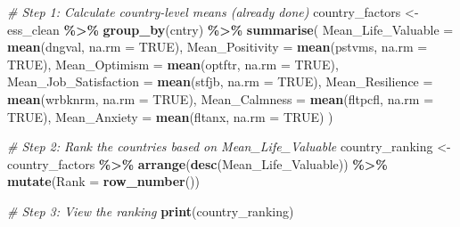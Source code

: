 \documentclass[
]{article}
\newenvironment{Shaded}{\begin{snugshade}}{\end{snugshade}}
\newcommand{\AttributeTok}[1]{\textcolor[rgb]{0.13,0.29,0.53}{#1}}
\newcommand{\CommentTok}[1]{\textcolor[rgb]{0.56,0.35,0.01}{\textit{#1}}}
\newcommand{\ConstantTok}[1]{\textcolor[rgb]{0.56,0.35,0.01}{#1}}
\newcommand{\FunctionTok}[1]{\textcolor[rgb]{0.13,0.29,0.53}{\textbf{#1}}}
\newcommand{\NormalTok}[1]{#1}
\newcommand{\OtherTok}[1]{\textcolor[rgb]{0.56,0.35,0.01}{#1}}
\newcommand{\SpecialCharTok}[1]{\textcolor[rgb]{0.81,0.36,0.00}{\textbf{#1}}}
\begin{document}
\begin{Shaded}
\begin{Highlighting}[]
\CommentTok{\# Step 1: Calculate country{-}level means (already done)}
\NormalTok{country\_factors }\OtherTok{\textless{}{-}}\NormalTok{ ess\_clean }\SpecialCharTok{\%\textgreater{}\%}
  \FunctionTok{group\_by}\NormalTok{(cntry) }\SpecialCharTok{\%\textgreater{}\%}
  \FunctionTok{summarise}\NormalTok{(}
    \AttributeTok{Mean\_Life\_Valuable =} \FunctionTok{mean}\NormalTok{(dngval, }\AttributeTok{na.rm =} \ConstantTok{TRUE}\NormalTok{),}
    \AttributeTok{Mean\_Positivity =} \FunctionTok{mean}\NormalTok{(pstvms, }\AttributeTok{na.rm =} \ConstantTok{TRUE}\NormalTok{),}
    \AttributeTok{Mean\_Optimism =} \FunctionTok{mean}\NormalTok{(optftr, }\AttributeTok{na.rm =} \ConstantTok{TRUE}\NormalTok{),}
    \AttributeTok{Mean\_Job\_Satisfaction =} \FunctionTok{mean}\NormalTok{(stfjb, }\AttributeTok{na.rm =} \ConstantTok{TRUE}\NormalTok{),}
    \AttributeTok{Mean\_Resilience =} \FunctionTok{mean}\NormalTok{(wrbknrm, }\AttributeTok{na.rm =} \ConstantTok{TRUE}\NormalTok{),}
    \AttributeTok{Mean\_Calmness =} \FunctionTok{mean}\NormalTok{(fltpcfl, }\AttributeTok{na.rm =} \ConstantTok{TRUE}\NormalTok{),}
    \AttributeTok{Mean\_Anxiety =} \FunctionTok{mean}\NormalTok{(fltanx, }\AttributeTok{na.rm =} \ConstantTok{TRUE}\NormalTok{)}
\NormalTok{  )}

\CommentTok{\# Step 2: Rank the countries based on \textquotesingle{}Mean\_Life\_Valuable\textquotesingle{}}
\NormalTok{country\_ranking }\OtherTok{\textless{}{-}}\NormalTok{ country\_factors }\SpecialCharTok{\%\textgreater{}\%}
  \FunctionTok{arrange}\NormalTok{(}\FunctionTok{desc}\NormalTok{(Mean\_Life\_Valuable)) }\SpecialCharTok{\%\textgreater{}\%}
  \FunctionTok{mutate}\NormalTok{(}\AttributeTok{Rank =} \FunctionTok{row\_number}\NormalTok{())}

\CommentTok{\# Step 3: View the ranking}
\FunctionTok{print}\NormalTok{(country\_ranking)}
\end{Highlighting}
\end{Shaded}
\end{document}

